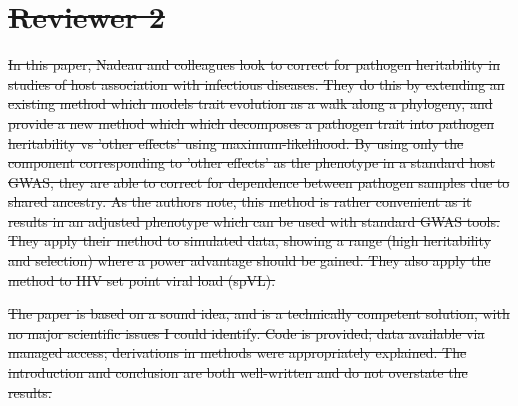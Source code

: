 \documentclass[12pt]{article} %
\providecommand{\DIFdel}[1]{{\protect\color{red}\sout{#1}}}                      %
\begin{document}
\begin{enumerate}
{}
\end{enumerate}%

\section*{\DIFdel{Reviewer 2}}

\DIFdel{In this paper, Nadeau and colleagues look to correct for pathogen heritability in studies of host association with infectious diseases. They do this by extending an existing method which models trait evolution as a walk along a phylogeny, and provide a new method which which decomposes a pathogen trait into pathogen heritability vs 'other effects' using maximum-likelihood. By using only the component corresponding to 'other effects' as the phenotype in a standard host GWAS, they are able to correct for dependence between pathogen samples due to shared ancestry. As the authors note, this method is rather convenient as it results in an adjusted phenotype which can be used with standard GWAS tools. They apply their method to simulated data, showing a range (high heritability and selection) where a power advantage should be gained. They also apply the method to HIV set point viral load (spVL).
}%

\DIFdel{The paper is based on a sound idea, and is a technically competent solution, with no major scientific issues I could identify. Code is provided; data available via managed access; derivations in methods were appropriately explained. The introduction and conclusion are both well-written and do not overstate the results.
}%
\end{document}
